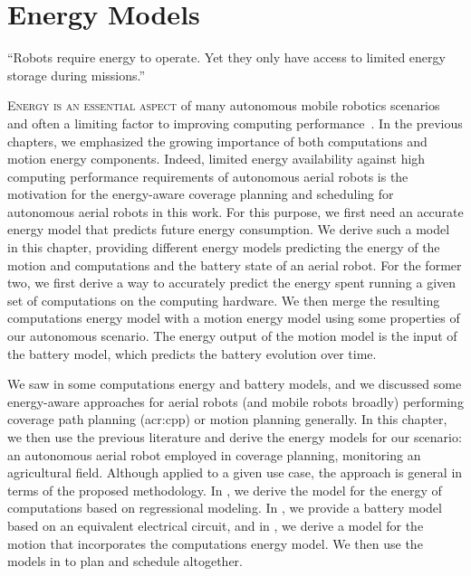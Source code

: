 
%
%
%
%
\chapter{Energy Models}
\label{cp:model}

\begin{chapquote}{\cite{ondruska2015scheduled}}
  ``Robots require energy to operate. Yet they only have access to limited energy storage during missions.''
\end{chapquote}

\vspace*{1em}

\lettrine{E}{nergy is an essential aspect} of many autonomous mobile robotics scenarios~\citep{mei2005case} and often a limiting factor to improving computing performance~\citep{horowitz2014computing}. In the previous chapters, we emphasized the growing importance of both computations and motion energy components. Indeed, limited energy availability against high computing performance requirements of autonomous aerial robots is the motivation for the energy-aware coverage planning and scheduling for autonomous aerial robots in this work. For this purpose, we first need an accurate energy model that predicts future energy consumption. We derive such a model in this chapter, providing different energy models predicting the energy of the motion and computations and the battery state of an aerial robot. For the former two, we first derive a way to accurately predict the energy spent running a given set of computations on the computing hardware. We then merge the resulting computations energy model with a motion energy model using some properties of our autonomous scenario.  The energy output of the motion model is the input of the battery model, which predicts the battery evolution over time.

We saw in  some computations energy and battery models, and we discussed some energy-aware approaches for aerial robots (and mobile robots broadly) performing coverage path planning (\Gls{acr:cpp}) or motion planning generally. In this chapter, we then use the previous literature and derive the energy models for our scenario: an autonomous aerial robot employed in coverage planning, monitoring an agricultural field. Although applied to a given use case, the approach is general in terms of the proposed methodology. In , we derive the model for the energy of computations based on regressional modeling. In , we provide a battery model based on an equivalent electrical circuit, and in , we derive a model for the motion that incorporates the computations energy model. We then use the models in  to plan and schedule altogether.


